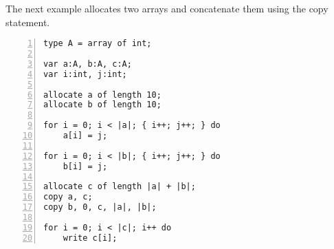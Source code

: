 \documentclass{article}
\begin{document}
The next example allocates two arrays and concatenate them using the copy statement.
\begin{lstlisting}[numbers=left, firstnumber=1]
type A = array of int;

var a:A, b:A, c:A; 
var i:int, j:int;

allocate a of length 10;
allocate b of length 10;

for i = 0; i < |a|; { i++; j++; } do
    a[i] = j;

for i = 0; i < |b|; { i++; j++; } do
    b[i] = j;

allocate c of length |a| + |b|;
copy a, c;
copy b, 0, c, |a|, |b|;

for i = 0; i < |c|; i++ do
    write c[i];

\end{lstlisting}
\end{document}

